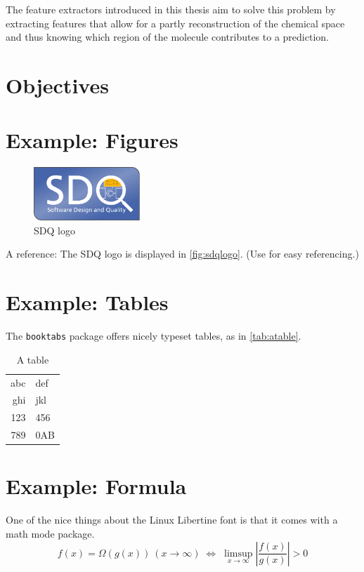 The feature extractors introduced in this thesis aim to solve this problem by extracting features that allow for a
partly reconstruction of the chemical space and thus knowing which region of the molecule contributes to a prediction.


\section{Objectives}



\section{Example: Figures}
\label{sec:Introduction:Figures}
\begin{figure}
\centering
\includegraphics[width=4cm]{logos/sdqlogo}
\caption{SDQ logo}
\label{fig:sdqlogo}
\end{figure}

A reference: The SDQ logo is displayed in \autoref{fig:sdqlogo}. 
(Use  for easy referencing.) 

\section{Example: Tables}
The \texttt{booktabs} package offers nicely typeset tables, as in \autoref{tab:atable}.

\label{sec:Introduction:Tables}
\begin{table}
\centering
\begin{tabular}{r l}
\toprule
abc & def\\
ghi & jkl\\
\midrule
123 & 456\\
789 & 0AB\\
\bottomrule
\end{tabular}
\caption{A table}
\label{tab:atable}
\end{table}

\section{Example: Formula}
One of the nice things about the Linux Libertine font is that it comes with
a math mode package.
\begin{displaymath}
f(x)=\Omega(g(x))\ (x\rightarrow\infty)\;\Leftrightarrow\;
\limsup_{x \to \infty} \left|\frac{f(x)}{g(x)}\right|> 0
\end{displaymath}

